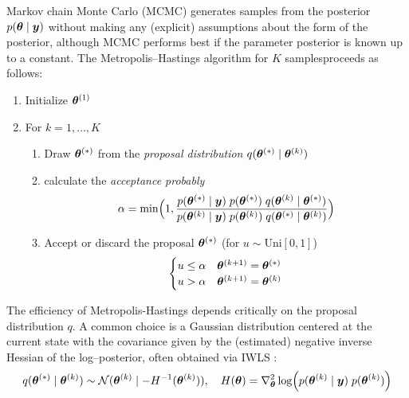 Markov chain Monte Carlo (MCMC) generates samples from the posterior $p(\bm{\theta}\mid \bm{y})$ without making any (explicit) assumptions about the form of the posterior, although MCMC performs best if the parameter posterior is known up to a constant.
The Metropolis–Hastings algorithm \citep{hastings_monte_1970} for $K$ samples\footnotemark proceeds as follows:
\begin{enumerate}
    \item Initialize $\bm{\theta}^{(1)}$
    \item For $k = 1, \dots, K$
    \begin{enumerate}
        \item Draw $\bm{\theta}^{(*)}$ from the \textit{proposal distribution} $q(\bm{\theta}^{(*)} \mid \bm{\theta}^{(k)})$
        \item calculate the \textit{acceptance probably} 
            \begin{equation*}
                \alpha = \min \Bigl(
                    1, \frac{
                        p(\bm{\theta}^{(*)} \mid \bm{y})\; p(\bm{\theta}^{(*)}) \; q(\bm{\theta}^{(k)} \mid \bm{\theta}^{(*)})}{
                            p(\bm{\theta}^{(k)} \mid \bm{y})\; p(\bm{\theta}^{(k)}) \; q(\bm{\theta}^{(*)} \mid \bm{\theta}^{(k)})
                        }
                    \Bigr)
            \end{equation*}
        \item Accept or discard the proposal $\bm{\theta}^{(*)}$ (for $u \sim \text{Uni}[0, 1]$)
            \begin{equation*}
                \begin{cases}
                    u \le \alpha & \bm{\theta}^{(k+1)} = \bm{\theta}^{(*)}\\
                    u > \alpha & \bm{\theta}^{(k+1)} = \bm{\theta}^{(k)}\\
                \end{cases}
            \end{equation*}
    \end{enumerate}
\end{enumerate}

The efficiency of Metropolis-Hastings depends critically on the proposal distribution $q$.
A common choice is a Gaussian distribution centered at the current state with the covariance given by the (estimated) negative inverse Hessian of the log–posterior, often obtained via IWLS \citep{gamerman_markov_1998,lenk_bayesian_2000,scott_data_2011}:\footnotemark
\begin{equation*}
    q(\bm{\theta}^{(*)} \mid \bm{\theta}^{(k)}) \sim \mathcal{N}(\bm{\theta}^{(k)} \mid -H^{-1}(\bm{\theta}^{(k)})), \quad H(\bm{\theta}) = \nabla_{\bm{\theta}}^2  \log \Bigl(p(\bm{\theta}^{(k)} \mid \bm{y})\; p(\bm{\theta}^{(k)})\Bigr)
\end{equation*}

